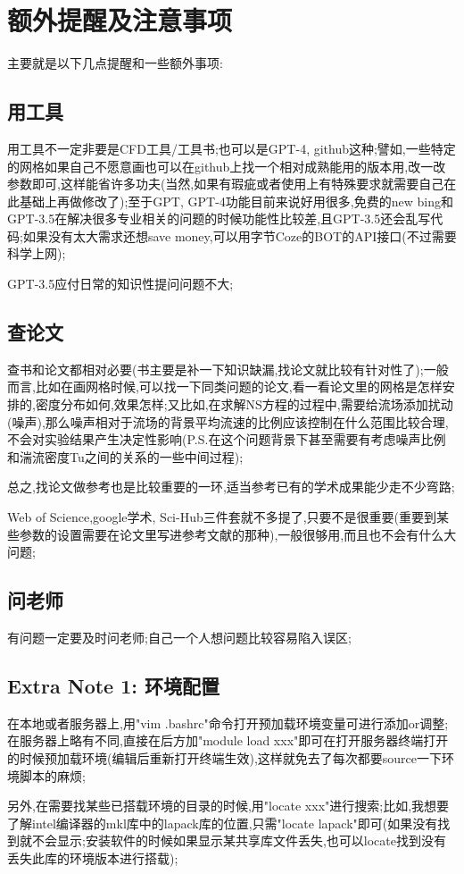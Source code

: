 \chapter{额外提醒及注意事项}
主要就是以下几点提醒和一些额外事项:
\section{用工具}
用工具不一定非要是CFD工具/工具书;也可以是GPT-4, github这种;譬如,一些特定的网格如果自己不愿意画也可以在github上找一个相对成熟能用的版本用,改一改参数即可,这样能省许多功夫(当然,如果有瑕疵或者使用上有特殊要求就需要自己在此基础上再做修改了);至于GPT, GPT-4功能目前来说好用很多,免费的new bing和GPT-3.5在解决很多专业相关的问题的时候功能性比较差,且GPT-3.5还会乱写代码;如果没有太大需求还想save money,可以用字节Coze的BOT的API接口(不过需要科学上网);\par
GPT-3.5应付日常的知识性提问问题不大;

\section{查论文}
查书和论文都相对必要(书主要是补一下知识缺漏,找论文就比较有针对性了);一般而言,比如在画网格时候,可以找一下同类问题的论文,看一看论文里的网格是怎样安排的,密度分布如何,效果怎样;又比如,在求解NS方程的过程中,需要给流场添加扰动(噪声),那么噪声相对于流场的背景平均流速的比例应该控制在什么范围比较合理,不会对实验结果产生决定性影响(P.S.在这个问题背景下甚至需要有考虑噪声比例和湍流密度Tu之间的关系的一些中间过程);\par
总之,找论文做参考也是比较重要的一环,适当参考已有的学术成果能少走不少弯路;\par
Web of Science,google学术, Sci-Hub三件套就不多提了,只要不是很重要(重要到某些参数的设置需要在论文里写进参考文献的那种),一般很够用,而且也不会有什么大问题;

\section{问老师}
有问题一定要及时问老师;自己一个人想问题比较容易陷入误区;


\section{Extra Note 1: 环境配置}
在本地或者服务器上,用"vim .bashrc"命令打开预加载环境变量可进行添加or调整;在服务器上略有不同,直接在后方加"module load xxx"即可在打开服务器终端打开的时候预加载环境(编辑后重新打开终端生效),这样就免去了每次都要source一下环境脚本的麻烦;\par

另外,在需要找某些已搭载环境的目录的时候,用"locate xxx"进行搜索;比如,我想要了解intel编译器的mkl库中的lapack库的位置,只需"locate lapack"即可(如果没有找到就不会显示;安装软件的时候如果显示某共享库文件丢失,也可以locate找到没有丢失此库的环境版本进行搭载);




